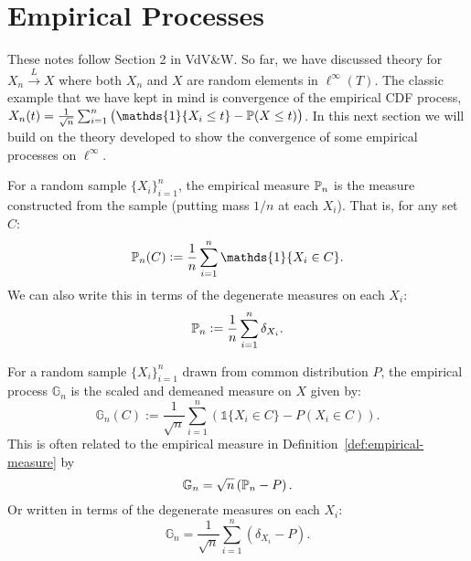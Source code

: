 \section{Empirical Processes}

These notes follow Section 2 in VdV\&W. So far, we have discussed theory for \(X_n \overset{L}{\to} X\) where both \(X_n\) and  \(X\) are random elements in  \(\ell^\infty(T)\). The classic example that we have kept in mind is convergence of the empirical CDF process, \(X_n(t) = \frac{1}{\sqrt{n}}\sum_{i=1}^n \left(\mathds{1}\{X_i \leq t\} - \P(X\leq t)\right)\). In this next section we will build on the theory developed to show the convergence of some empirical processes on \(\ell^\infty\).

\begin{definition}
	\label{def:empirical-measure}
	For a random sample \(\{X_i\}_{i=1}^n\), the empirical measure \(\P_n\) is the measure constructed from the sample (putting mass \(1/n\) at each  \(X_i\)). That is, for any set \(C\):
	 \[
		 \P_n(C) := \frac{1}{n}\sum_{i=1}^n \mathds{1}\{X_i \in C\}  
	.\]
	We can also write this in terms of the degenerate measures on each \(X_i\):
	 \[
		 \P_n := \frac{1}{n}\sum_{i=1}^n \delta_{X_i} 
	.\] 
\end{definition}

\begin{definition}
	\label{def:empirical-process}
	For a random sample \(\{X_i\}_{i=1}^n\) drawn from common distribution \(P\), the empirical process \(\mathbb{G}_n\) is the scaled and demeaned measure on \(X\) given by:
	\[\mathbb{G}_n(C) := \frac{1}{\sqrt{n}}\sum_{i=1}^n \left(\mathds{1}\{X_i \in C\} - P(X_i \in C)\right).\]
	This is often related to the empirical measure in Definition~\ref{def:empirical-measure} by
	\[
		\mathbb{G}_n = \sqrt{n}\left(\P_n - P\right)
	.\]
	Or written in terms of the degenerate measures on each \(X_i\):
	 \[
		 \mathbb{G}_n = \frac{1}{\sqrt{n}}\sum_{i=1}^n \left(\delta_{X_i}-P\right) 
	.\] 
\end{definition}

